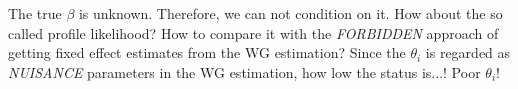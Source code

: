 \begin{question}
    The true $\beta$ is unknown. Therefore, we can not condition on it. How about the so called profile likelihood? How to compare it with the \textit{FORBIDDEN} approach of getting fixed effect estimates from the WG estimation? Since the $\theta_i$ is regarded as \textit{NUISANCE} parameters in the WG estimation, how low the status is...! Poor $\theta_i$!
\end{question}
